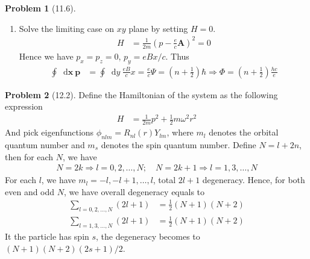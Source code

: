 \documentclass[twoside,11pt]{article}
\renewcommand*\d{\mathop{}\!\mathrm{d}}
\theoremstyle{definition}
\newtheorem{problem}{Problem}
\theoremstyle{remark}
\begin{document}
\begin{problem}[11.6]
\begin{enumerate}[label=(\alph*)]
\item Solve the limiting case on $xy$ plane by setting $H=0$.
\begin{align*}
    H &= \frac{1}{2m}\left(p - \frac{e}{c}\mathbf{A}\right)^2 = 0
\end{align*}
Hence we have $p_x=p_z=0$, $p_y=eBx/c$.
Thus
\begin{align*}
    \oint \d\mathbf{x}\ \mathbf{p} &= 
    \oint \d y\ \frac{eB}{c}x = \frac{e}{c}\Psi
    = \left(n+\frac{1}{2}\right)\hbar
    \Rightarrow \Phi = \left(n+\frac{1}{2}\right)\frac{hc}{e}
\end{align*}


\end{enumerate}
\end{problem}


\begin{problem}[12.2] 
Define the Hamiltonian of the system as the following expression
\begin{align*}
    H &= \frac{1}{2m}p^2 + \frac{1}{2}m\omega^2 r^2
\end{align*}
And pick eigenfunctions $\phi_{nlm}=R_{nl}(r)Y_{lm}$,
where $m_l$ denotes the orbital quantum number and 
$m_s$ denotes the spin quantum number.
Define $N=l+2n$, then for each $N$, we have
\begin{align*}
    N = 2k\Rightarrow l = 0, 2, \dots, N;
    \quad
    N = 2k+1\Rightarrow l = 1, 3, \dots, N
\end{align*}
For each $l$, we have $m_l=-l,-l+1,\dots, l$,
total $2l+1$ degeneracy.
Hence, for both even and odd $N$, we have overall
degeneracy equals to 
\begin{align*}
    \sum_{l=0,2,\dots,N}(2l+1) &= \frac{1}{2}(N+1)(N+2)\\
    \sum_{l=1,3,\dots,N}(2l+1) &= \frac{1}{2}(N+1)(N+2)
\end{align*}
It the particle has spin $s$, the degeneracy becomes to
$(N+1)(N+2)(2s+1)/2$.


\end{problem}
\end{document}
